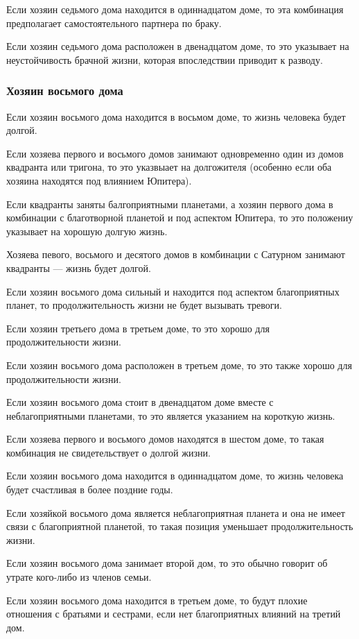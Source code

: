 Если хозяин седьмого дома находится в одиннадцатом доме, то эта комбинация предполагает самостоятельного партнера по браку.

Если хозяин седьмого дома расположен в двенадцатом доме, то это указывает на неустойчивость брачной жизни, которая впоследствии приводит к разводу.


\subsubsection*{Хозяин восьмого дома}
Если хозяин восьмого дома находится в восьмом доме, то жизнь человека будет долгой.

Если хозяева первого и восьмого домов занимают одновременно один из домов квадранта или тригона, то это указвыает на долгожителя (особенно если оба хозяина находятся под влиянием Юпитера).

Если квадранты заняты балгоприятными планетами, а хозяин первого дома в комбинации с благотворной планетой и под аспектом Юпитера, то это положениу указывает на хорошую долгую жизнь.

Хозяева певого, восьмого и десятого домов в комбинации с Сатурном занимают квадранты --- жизнь будет долгой.

Если хозяин восьмого дома сильный и находится под аспектом благоприятных планет, то продолжительность жизни не будет вызывать тревоги.

Если хозяин третьего дома в третьем доме, то это хорошо для продолжительности жизни.

Если хозяин восьмого дома расположен в третьем доме, то это также хорошо для продолжительности жизни.

Если хозяин восьмого дома стоит в двенадцатом доме вместе с неблагоприятными планетами, то это является указанием на короткую жизнь.

Если хозяева первого и восьмого домов находятся в шестом доме, то такая комбинация не свидетельствует о долгой жизни.

Если хозяин восьмого дома находится в одиннадцатом доме, то жизнь человека будет счастливая в более поздние годы.

Если хозяйкой восьмого дома является неблагоприятная планета и она не имеет связи с благоприятной планетой, то такая позиция уменьшает продолжительность жизни.

Если хозяин восьмого дома занимает второй дом, то это обычно говорит об утрате кого-либо из членов семьи.

Если хозяин восьмого дома находится в третьем доме, то будут плохие отношения с братьями и сестрами, если нет благоприятных влияний на третий дом.

